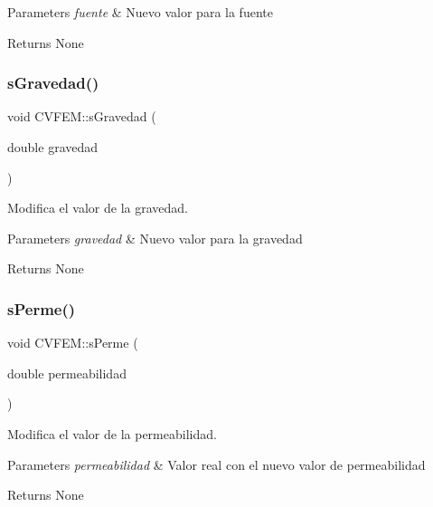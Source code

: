 \begin{DoxyParams}{Parameters}
{\em fuente} & Nuevo valor para la fuente \\
\hline
\end{DoxyParams}
\begin{DoxyReturn}{Returns}
None 
\end{DoxyReturn}
\hypertarget{class_c_v_f_e_m_aa8c7083144c757b4cc59bdaab84c6c0b}{}\label{class_c_v_f_e_m_aa8c7083144c757b4cc59bdaab84c6c0b} 
\subsubsection{\texorpdfstring{s\+Gravedad()}{sGravedad()}}
{\footnotesize\ttfamily void C\+V\+F\+E\+M\+::s\+Gravedad (\begin{DoxyParamCaption}\item[{double}]{gravedad }\end{DoxyParamCaption})\hspace{0.3cm}{\ttfamily [inline]}}



Modifica el valor de la gravedad. 


\begin{DoxyParams}{Parameters}
{\em gravedad} & Nuevo valor para la gravedad \\
\hline
\end{DoxyParams}
\begin{DoxyReturn}{Returns}
None 
\end{DoxyReturn}
\hypertarget{class_c_v_f_e_m_a716e517bc0c71ae9fbb76537e5b12138}{}\label{class_c_v_f_e_m_a716e517bc0c71ae9fbb76537e5b12138} 
\subsubsection{\texorpdfstring{s\+Perme()}{sPerme()}}
{\footnotesize\ttfamily void C\+V\+F\+E\+M\+::s\+Perme (\begin{DoxyParamCaption}\item[{double}]{permeabilidad }\end{DoxyParamCaption})\hspace{0.3cm}{\ttfamily [inline]}}



Modifica el valor de la permeabilidad. 


\begin{DoxyParams}{Parameters}
{\em permeabilidad} & Valor real con el nuevo valor de permeabilidad \\
\hline
\end{DoxyParams}
\begin{DoxyReturn}{Returns}
None 
\end{DoxyReturn}


